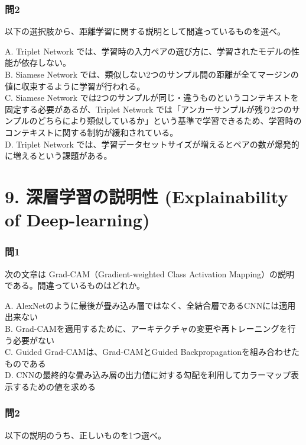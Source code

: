 \documentclass[
  letterpaper,
  DIV=11,
  numbers=noendperiod]{scrreprt}
\begin{document}
\subsection{問2}\label{ux554f2-6}

以下の選択肢から、距離学習に関する説明として間違っているものを選べ。

A. Triplet Network
では、学習時の入力ペアの選び方に、学習されたモデルの性能が依存しない。\\
B. Siamese Network
では、類似しない2つのサンプル間の距離が全てマージンの値に収束するように学習が行われる。\\
C. Siamese Network
では2つのサンプルが同じ・違うものというコンテキストを固定する必要があるが、Triplet
Network
では「アンカーサンプルが残り2つのサンプルのどちらにより類似しているか」という基準で学習できるため、学習時のコンテキストに関する制約が緩和されている。\\
D. Triplet Network
では、学習データセットサイズが増えるとペアの数が爆発的に増えるという課題がある。

\chapter{9. 深層学習の説明性 (Explainability of
Deep-learning)}\label{ux6df1ux5c64ux5b66ux7fd2ux306eux8aacux660eux6027-explainability-of-deep-learning}

\subsection{問1}\label{ux554f1-10}

次の文章は Grad-CAM（Gradient-weighted Class Activation
Mapping）の説明である。間違っているものはどれか。

A.
AlexNetのように最後が畳み込み層ではなく、全結合層であるCNNには適用出来ない\\
B.
Grad-CAMを適用するために、アーキテクチャの変更や再トレーニングを行う必要がない\\
C. Guided Grad-CAMは、Grad-CAMとGuided
Backpropagationを組み合わせたものである\\
D.
CNNの最終的な畳み込み層の出力値に対する勾配を利用してカラーマップ表示するための値を求める

\subsection{問2}\label{ux554f2-7}

以下の説明のうち、正しいものを1つ選べ。
\end{document}
